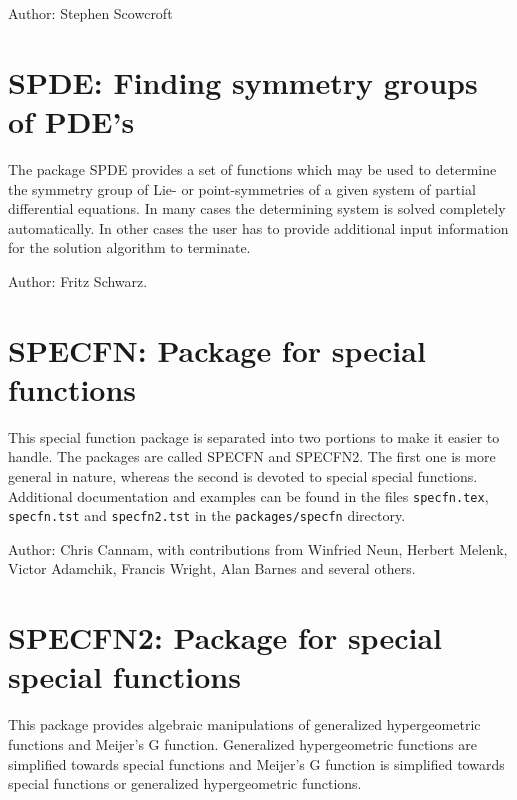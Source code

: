 Author: Stephen Scowcroft



\newpage

\section{SPDE: Finding symmetry groups of {PDE}'s}

\label{package:SPDE}

The package SPDE provides a set of functions which may be used to
determine the symmetry group of Lie- or point-symmetries of a given system
of partial differential equations. In many cases the determining system is
solved completely automatically. In other cases the user has to provide
additional input information for the solution algorithm to terminate.

Author: Fritz Schwarz.



\newpage

\section{SPECFN: Package for special functions} 

This special function package is separated into two portions to make
it easier to handle.  The packages are called SPECFN and SPECFN2.  The
first one is more general in nature, whereas the second is devoted to
special special functions.  Additional documentation and examples can
be found in the files \texttt{specfn.tex}, \texttt{specfn.tst} and
\texttt{specfn2.tst} in the \texttt{packages/specfn} directory.

Author:  Chris Cannam, with contributions from Winfried Neun, Herbert
Melenk, Victor Adamchik, Francis Wright, Alan Barnes and several others.



\section{SPECFN2: Package for special special functions} 


This package provides algebraic manipulations of generalized
hypergeometric functions and Meijer's G function.  Generalized
hypergeometric functions are simplified towards special functions and
Meijer's G function is simplified towards special functions or generalized
hypergeometric functions.

